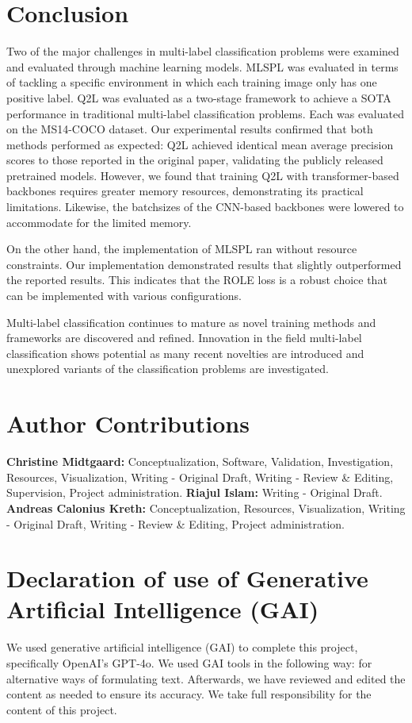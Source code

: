 \documentclass[lettersize,journal]{IEEEtran}
\begin{document}

\section{Conclusion}
Two of the major challenges in multi-label classification problems were examined and evaluated through machine learning models. MLSPL was evaluated in terms of tackling a specific environment in which each training image only has one positive label. Q2L was evaluated as a two-stage framework to achieve a SOTA performance in traditional multi-label classification problems. Each was evaluated on the MS14-COCO dataset. 
Our experimental results confirmed that both methods performed as expected: Q2L achieved identical mean average precision scores to those reported in the original paper, validating the publicly released pretrained models. However, we found that training Q2L with transformer-based backbones requires greater memory resources, demonstrating its practical limitations. Likewise, the batchsizes of the CNN-based backbones were lowered to accommodate for the limited memory.

On the other hand, the implementation of MLSPL ran without resource constraints. Our implementation demonstrated results that slightly outperformed the reported results. This indicates that the ROLE loss is a robust choice that can be implemented with various configurations. 

Multi-label classification continues to mature as novel training methods and frameworks are discovered and refined.  Innovation in the field multi-label classification shows potential as many recent novelties are introduced and unexplored variants of the classification problems are investigated. 

\appendices
\section{Author Contributions}

\noindent \textbf{Christine Midtgaard:} Conceptualization, Software, Validation, Investigation, Resources, Visualization, Writing - Original Draft, Writing - Review \& Editing, Supervision, Project administration. \textbf{Riajul Islam:} Writing - Original Draft. \textbf{Andreas Calonius Kreth:} Conceptualization, Resources, Visualization, Writing - Original Draft, Writing - Review \& Editing, Project administration.

\section{Declaration of use of Generative Artificial Intelligence (GAI)}
\noindent We used generative artificial intelligence (GAI) to complete this project, specifically OpenAI's GPT-4o. We used GAI tools in the following way: for alternative ways of formulating text. Afterwards, we have reviewed and edited the content as needed to ensure its accuracy. We take full responsibility for the content of this project. 



\end{document}
